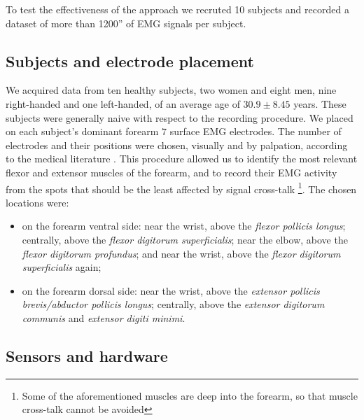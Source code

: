 To test the effectiveness of the approach we recruted 10 subjects and recorded a dataset of more than 1200'' of EMG signals per subject.

\subsection{Subjects and electrode placement}

We acquired data from
ten healthy subjects, two women and eight men, nine right-handed and one left-handed, of an average age of $30.9 \pm 8.45$ years. These subjects were generally naive with respect to the 
recording procedure.
We placed on each subject's dominant forearm $7$ surface EMG electrodes. The number of electrodes and their positions were chosen, visually and by palpation, according to the medical 
literature \cite{Kendall}. 
This procedure allowed us 
to identify the most relevant flexor and extensor muscles of the forearm, and to record their EMG activity from the spots that should be the least affected by signal 
cross-talk \footnote{Some of the aforementioned muscles are deep into the forearm, so that muscle cross-talk cannot be avoided}.
The chosen locations were:
\begin{itemize}

  \item on the forearm ventral side: near the wrist, above the 
    \emph{flexor pollicis longus}; centrally, above the \emph{flexor
    digitorum superficialis}; near the elbow, above the \emph{flexor
    digitorum profundus}; and near the wrist, above the \emph{flexor
    digitorum superficialis} again;

  \item on the forearm dorsal side: near the wrist, above the
    \emph{extensor pollicis brevis/abductor pollicis longus};
    centrally, above the \emph{extensor digitorum communis} and
    \emph{extensor digiti minimi}.

\end{itemize}

\subsection{Sensors and hardware}


